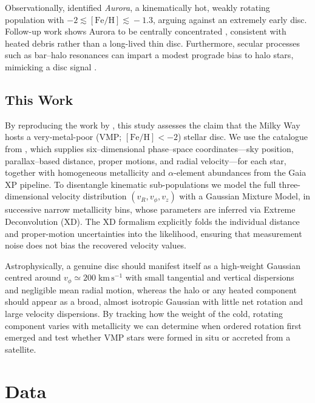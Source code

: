 \documentclass[a4paper,12pt]{article}
\begin{document}
Observationally, \citet{Belokurov2022} identified \textit{Aurora}, a kinematically hot, weakly rotating  
population with $-2\!\lesssim\![\mathrm{Fe/H}]\!\lesssim\!-1.3$, arguing against an extremely early disc.  
Follow-up work shows Aurora to be centrally concentrated \citep{Rix2022,Arentsen2020,Arentsen2020a}, 
consistent with heated debris rather than a long-lived thin disc.  
Furthermore, secular processes such as bar–halo resonances can impart a modest prograde bias to halo stars, 
mimicking a disc signal \citep{Dillamore2023}.  

\subsection{This Work}

By reproducing the work by \citet{zhang2024existencemetalpoordiscmilky}, this study assesses 
the claim that the Milky Way hosts a very-metal-poor (VMP; $[\mathrm{Fe/H}]<-2$) stellar disc. 
We use the catalogue from \citet{Andrae2023}, 
which supplies six–dimensional phase–space coordinates—sky position, parallax–based distance, 
proper motions, and radial velocity—for each star, together with homogeneous metallicity and 
$\alpha$-element abundances from the Gaia XP pipeline. To disentangle kinematic 
sub-populations we model the full three-dimensional 
velocity distribution $(v_R,v_\phi,v_z)$ with a Gaussian Mixture Model, in successive narrow metallicity bins, 
whose parameters are inferred 
via Extreme Deconvolution (XD). The XD formalism explicitly folds the individual distance and 
proper-motion uncertainties into the likelihood, ensuring that measurement noise does not bias 
the recovered velocity values.

Astrophysically, a genuine disc should manifest itself as a high-weight Gaussian centred around 
$v_\phi\simeq200\;\mathrm{km\,s^{-1}}$ with small tangential and vertical dispersions 
and negligible mean radial motion, whereas the 
halo or any heated component should appear as a broad, almost isotropic Gaussian with little net rotation 
and large velocity dispersions.  By tracking how the weight of the cold, 
rotating component varies with metallicity we can determine when ordered rotation first emerged and 
test whether VMP stars were formed in situ or accreted from a satellite.


\section{Data}
\label{sec:data}
\end{document}
